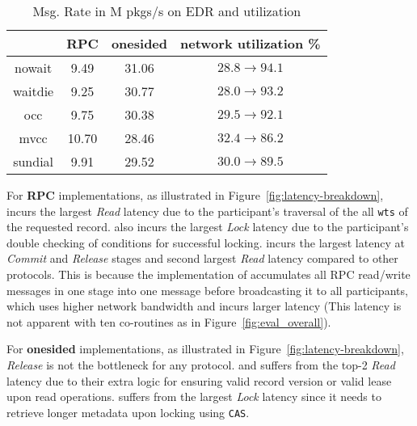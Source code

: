 \begin{table}[h!]
\vspace{-0mm}
\caption{Msg. Rate in M pkgs/s on EDR and utilization}
\vspace{-3mm}
\centering
\begin{tabular}{|c|c|c|c|}
 \hline
  &
 \textbf{RPC} & 
 \textbf{onesided} & network utilization \% \\
 \hline
 nowait & 9.49 & 31.06 & $28.8 \rightarrow 94.1$ \\
 \hline
 waitdie & 9.25	& 30.77 &  $28.0 \rightarrow 93.2$ \\
 \hline
 occ & 9.75 & 30.38 & $29.5 \rightarrow 92.1$   \\
 \hline
 mvcc & 10.70 & 28.46 & $32.4 \rightarrow 86.2$ \\
 \hline
 sundial & 9.91	& 29.52 & $30.0 \rightarrow 89.5$  \\
 \hline
\end{tabular}
\vspace{-0mm}
\label{tbl:message-rate}
\end{table}

For \textbf{RPC} implementations, as illustrated in Figure~\ref{fig:latency-breakdown}, \mvcc incurs the largest \textit{Read} latency due to the participant's traversal of the all \texttt{wts} of the requested record. \mvcc also incurs the largest \textit{Lock} latency due to the participant's double checking of conditions for successful locking. \occ incurs the largest latency at \textit{Commit} and \textit{Release} stages and second largest \textit{Read} latency compared to other protocols. This is because the \occ implementation of \cite{wei2018deconstructing} accumulates all RPC read/write messages in one stage into one message before broadcasting it to all participants, which uses higher network bandwidth and incurs larger latency (This latency is not apparent with ten co-routines as in Figure~\ref{fig:eval_overall}). 

For \textbf{onesided} implementations, as illustrated in Figure~\ref{fig:latency-breakdown}, \textit{Release} is not the bottleneck for any protocol. \mvcc and \sundial suffers from the top-2 \textit{Read} latency due to their extra logic for ensuring valid record version or valid lease upon read operations. \mvcc suffers from the largest \textit{Lock} latency since it needs to retrieve longer metadata upon locking using \texttt{CAS}. 

